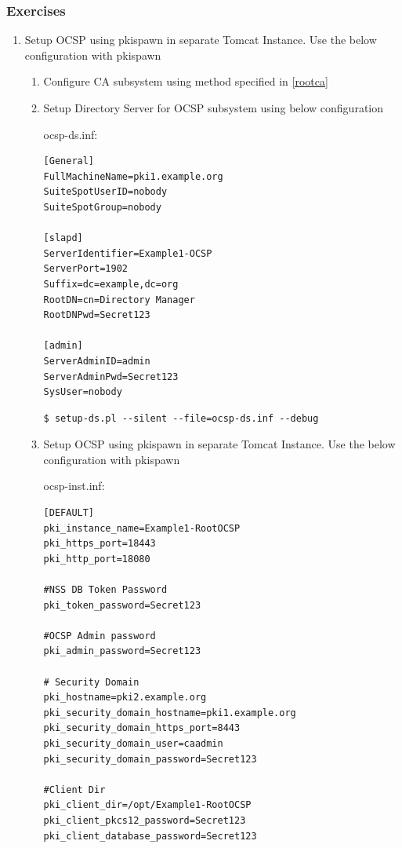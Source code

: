 \documentclass[a4paper]{article}
\begin{document}
\subsubsection{Exercises}
    \begin{enumerate}[label*=\arabic*.]
        \item Setup OCSP using pkispawn in separate Tomcat Instance. Use the below configuration with pkispawn
            \begin{enumerate}[label*=\arabic*.]
                \item Configure CA subsystem using method specified in \ref{rootca}
                \item Setup Directory Server for OCSP subsystem using below configuration 

                ocsp-ds.inf:
                    \begin{lstlisting}[style=configFile]
[General]
FullMachineName=pki1.example.org
SuiteSpotUserID=nobody
SuiteSpotGroup=nobody

[slapd]
ServerIdentifier=Example1-OCSP
ServerPort=1902
Suffix=dc=example,dc=org
RootDN=cn=Directory Manager
RootDNPwd=Secret123

[admin]
ServerAdminID=admin
ServerAdminPwd=Secret123
SysUser=nobody
                    \end{lstlisting}
                    \begin{lstlisting}[style=bashInputStyle]
$ setup-ds.pl --silent --file=ocsp-ds.inf --debug                
                    \end{lstlisting}
                \item \label{ocsp_sep_tomcat} Setup OCSP using pkispawn in separate Tomcat Instance. Use the below configuration with pkispawn

                    ocsp-inst.inf:
                    \begin{lstlisting}[style=configFile]
[DEFAULT]
pki_instance_name=Example1-RootOCSP
pki_https_port=18443
pki_http_port=18080

#NSS DB Token Password
pki_token_password=Secret123

#OCSP Admin password
pki_admin_password=Secret123

# Security Domain
pki_hostname=pki2.example.org
pki_security_domain_hostname=pki1.example.org
pki_security_domain_https_port=8443
pki_security_domain_user=caadmin
pki_security_domain_password=Secret123

#Client Dir
pki_client_dir=/opt/Example1-RootOCSP
pki_client_pkcs12_password=Secret123
pki_client_database_password=Secret123


\end{lstlisting}
\end{enumerate}
\end{enumerate}
\end{document}
